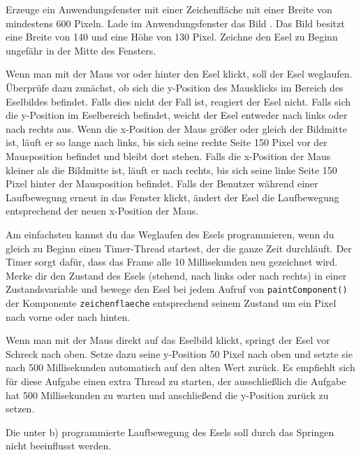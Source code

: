 \begin{compactenum}[a)]
\item Erzeuge ein Anwendungsfenster mit einer Zeichenfläche mit einer Breite
von mindestens 600 Pixeln. Lade im Anwendungsfenster das Bild .
Das Bild besitzt eine Breite von 140 und eine Höhe von 130 Pixel. Zeichne den
Esel zu Beginn ungefähr in der Mitte des Fensters.

\item Wenn man mit der Maus vor oder hinter den Esel klickt, soll der Esel
 weglaufen. Überprüfe dazu zunächst, ob sich die y-Position des Mausklicks im
 Bereich des Eselbildes befindet. Falls dies nicht der Fall ist, reagiert der
 Esel nicht. Falls sich die y-Position im Eselbereich befindet, weicht der Esel
 entweder nach links oder nach rechts aus. Wenn die x-Position der Maus größer
 oder gleich der Bildmitte ist, läuft er so lange nach links, bis sich seine
 rechte Seite 150 Pixel vor der Mausposition befindet und bleibt dort stehen.
 Falls die x-Position der Maus kleiner als die Bildmitte ist, läuft er nach
 rechts, bis sich seine linke Seite 150 Pixel hinter der Mausposition befindet.
 Falls der Benutzer während einer Laufbewegung erneut in das Fenster klickt,
 ändert der Esel die Laufbewegung entsprechend der neuen x-Position der Maus.

 Am einfachsten kannst du das Weglaufen des Esels programmieren, wenn du gleich
 zu Beginn einen Timer-Thread startest, der die ganze Zeit durchläuft. Der
 Timer sorgt dafür, dass das Frame alle 10 Millisekunden neu gezeichnet wird.
 Merke dir den Zustand des Esels (stehend, nach links oder nach rechts) in
 einer Zustandsvariable und bewege den Esel bei jedem Aufruf von
 \lstinline|paintComponent()| der Komponente \lstinline|zeichenflaeche|
 entsprechend seinem Zustand um ein Pixel nach vorne oder nach hinten.

\item Wenn man mit der Maus direkt auf das Eselbild klickt, springt der Esel vor
Schreck nach oben. Setze dazu seine y-Position 50 Pixel nach oben und setzte
sie nach 500 Millisekunden automatisch auf den alten Wert zurück. Es empfiehlt
sich für diese Aufgabe einen extra Thread zu starten, der ausschließlich die
Aufgabe hat 500 Millisekunden zu warten und anschließend die y-Position zurück
zu setzen.

Die unter b) programmierte Laufbewegung des Esels soll durch das Springen nicht
beeinflusst werden.
\end{compactenum}